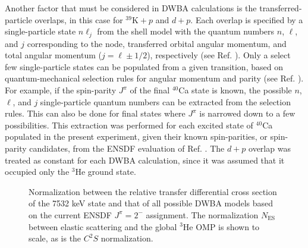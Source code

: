 Another factor that must be considered in DWBA calculations is the transferred-particle overlaps, in this case for $^{39}\mathrm{K}+p$ and $d+p$. Each overlap is specified by a single-particle state $n \ell_{j}$ from the shell model with the quantum numbers $n$, $\ell$, and $j$ corresponding to the node, transferred orbital angular momentum, and total angular momentum ($j = \ell \pm 1/2$), respectively (see Ref. \cite{Krane1987}). Only a select few single-particle states can be populated from a given transition, based on quantum-mechanical selection rules for angular momentum and parity (see Ref. \cite{Iliadis2015}). For example, if the spin-parity $J^{\pi}$ of the final $^{40}$Ca state is known, the possible $n$, $\ell$, and $j$ single-particle quantum numbers can be extracted from the selection rules. This can also be done for final states where $J^{\pi}$ is narrowed down to a few possibilities. This extraction was performed for each excited state of $^{40}$Ca populated in the present experiment, given their known spin-parities, or spin-parity candidates, from the ENSDF evaluation of Ref. \cite{Chen2017}. The $d+p$ overlap was treated as constant for each DWBA calculation, since it was assumed that it occupied only the $^{3}$He ground state.

\begin{figure}[t]
\centering
{}
\caption{\label{fig:7532keV_NoNorm}Normalization between the relative transfer differential cross section of the 7532 keV state and that of all possible DWBA models based on the current ENSDF $J^{\pi} = 2^{-}$ assignment. The normalization $N_{\mathrm{ES}}$ between elastic scattering and the global $^{3}$He OMP is shown to scale, as is the $C^{2}S$ normalization.}
\end{figure}

